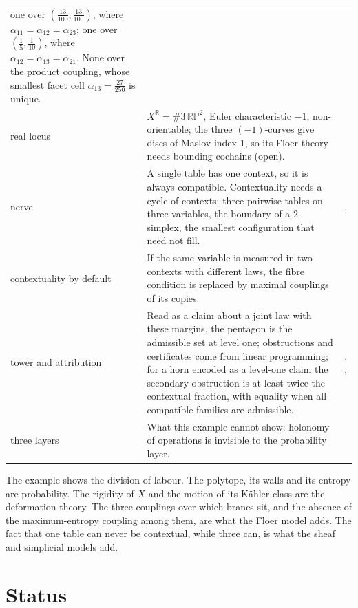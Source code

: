 \documentclass[11pt]{article}
\theoremstyle{definition}
\theoremstyle{remark}
\newcommand{\R}{\mathbb{R}}
\begin{document}
\begin{center}
\begin{longtable}{p{2.6cm}p{8.3cm}p{3.8cm}}
one over $(\frac{13}{100},\frac{13}{100})$, where $\alpha_{11}=\alpha_{12}=\alpha_{23}$; one over $(\frac15,\frac1{10})$, where $\alpha_{12}=\alpha_{13}=\alpha_{21}$.
None over the product coupling, whose smallest facet cell $\alpha_{13}=\frac{27}{250}$ is unique. & \cite[Thm.~8.2]{Bridges}\\
real locus & $X^{\R}=\#3\,\mathbb{RP}^2$, Euler characteristic $-1$, non-orientable; the three $(-1)$-curves give discs of Maslov index $1$, so its Floer
theory needs bounding cochains (open). & \cite[Prop.~8.6]{Bridges}\\
nerve & A single table has one context, so it is always compatible. Contextuality needs a cycle of contexts: three pairwise tables on three
variables, the boundary of a $2$-simplex, the smallest configuration that need not fill. & \cite[Prop.~4.5]{Conditionals}, \cite[Prop.~6.2(ii)]{Bands}\\
contextuality by default & If the same variable is measured in two contexts with different laws, the fibre condition is replaced by maximal
couplings of its copies. & \cite[\S4]{Bridges}\\
tower and attribution & Read as a claim about a joint law with these margins, the pentagon is the admissible set at level one; obstructions
and certificates come from linear programming; for a horn encoded as a level-one claim the secondary obstruction is at least twice the
contextual fraction, with equality when all compatible families are admissible. & \cite{Tower}, \cite[Thm.~11.2]{Conditionals}, \cite{Attribution}\\
three layers & What this example cannot show: holonomy of operations is invisible to the probability layer. & \cite{ThreeLayers}\\
\bottomrule
\end{longtable}
\end{center}

The example shows the division of labour. The polytope, its walls and its entropy are probability. The rigidity of $X$ and the motion of its
Kähler class are the deformation theory. The three couplings over which branes sit, and the absence of the maximum-entropy coupling among
them, are what the Floer model adds. The fact that one table can never be contextual, while three can, is what the sheaf and simplicial
models add.

\section{Status}\label{sec:status}
\end{document}
